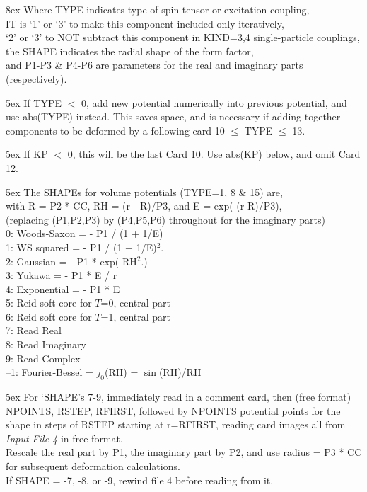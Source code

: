 \documentclass[11pt]{article}
\begin{document}
%
%
\hangindent 8ex  Where
      TYPE indicates type of spin tensor or excitation coupling,
\\  IT is `1' or `3' to make this component included only iteratively,\\
 \hspace*{8mm} `2' or `3' to NOT subtract this component in KIND=3,4 single-particle
 couplings,
\\  the SHAPE indicates the radial shape of the form factor,
\\  and P1-P3 \& P4-P6 are parameters for the real and imaginary
parts (respectively).


\medskip

\hangindent 5ex
If TYPE $<$ 0, add new potential numerically into previous potential,
and use abs(TYPE) instead.   This saves space, and is necessary if adding
together components to be deformed by a following card 10 $\leq$ TYPE $\leq$ 13.

\hangindent 5ex
If KP $<$ 0, this will be the last Card 10.  Use abs(KP) below,
and omit Card 12.
\bigskip

\hangindent 5ex
The SHAPEs for volume potentials (TYPE=1, 8 \& 15) are,
\\
with R = P2 * CC, RH = (r - R)/P3, and E = exp(-(r-R)/P3),
\\
(replacing (P1,P2,P3) by (P4,P5,P6) throughout for the imaginary parts)\\
%
   0: Woods-Saxon  = - P1 / (1 + 1/E)
\\ 1: WS squared   = - P1 / (1 + 1/E)$^2$.
\\ 2: Gaussian     = - P1 * exp(-RH$^2$.)
\\ 3: Yukawa       = - P1 * E / r
\\ 4: Exponential  = - P1 * E
\\ 5: Reid soft core for $T$=0, central part
\\ 6: Reid soft core for $T$=1, central part
\\ 7: Read Real
\\ 8: Read Imaginary
\\ 9: Read Complex
\\--1: Fourier-Bessel = $j_0$(RH) = $\sin$(RH)/RH


\hangindent 5ex
For `SHAPE's 7-9, immediately read in a comment card,
then (free format) NPOINTS, RSTEP, RFIRST,
followed by NPOINTS potential points
for the shape in steps of RSTEP starting at r=RFIRST,
reading card images all from {\em Input File 4} in free format.
\\
Rescale the real part by P1, the imaginary part by P2,
and use radius = P3 * CC for subsequent deformation calculations.
\\
If SHAPE = -7, -8, or -9, rewind file 4 before reading from it.
\bigskip
\end{document}
